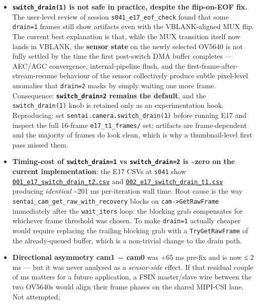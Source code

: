 \begin{itemize}
\tightlist
\item
  \textbf{\texttt{switch\_drain(1)} is not safe in practice, despite the
  flip-on-EOF fix.} The user-level review of session
  \texttt{s041\_e17\_eof\_check} found that some \texttt{drain=1} frames
  still show artifacts even with the VBLANK-aligned MUX flip. The
  current best explanation is that, while the MUX transition itself now
  lands in VBLANK, the \textbf{sensor state} on the newly selected
  OV5640 is not fully settled by the time the first post-switch DMA
  buffer completes --- AEC/AGC convergence, internal-pipeline flush, and
  the first-frame-after-stream-resume behaviour of the sensor
  collectively produce subtle pixel-level anomalies that
  \texttt{drain=2} masks by simply waiting one more frame. Consequence:
  \textbf{\texttt{switch\_drain=2} remains the default}, and the
  \texttt{switch\_drain(1)} knob is retained only as an experimentation
  hook. Reproducing: set \texttt{sentai.camera.switch\_drain(1)} before
  running E17 and inspect the full 16-frame \texttt{e17\_t1\_frames/}
  set; artifacts are frame-dependent and the majority of frames do look
  clean, which is why a thumbnail-level first pass missed them.
\item
  \textbf{Timing-cost of \texttt{switch\_drain=1} vs
  \texttt{switch\_drain=2} is \textasciitilde zero on the current
  implementation}: the E17 CSVs at \texttt{s041} show
  \href{../experiments/s041_e17_eof_check/001_e17_switch_drain_t2.csv}{\texttt{001\_e17\_switch\_drain\_t2.csv}}
  and
  \href{../experiments/s041_e17_eof_check/002_e17_switch_drain_t1.csv}{\texttt{002\_e17\_switch\_drain\_t1.csv}}
  producing \emph{identical} \textasciitilde201 ms per-iteration wall
  time. Root cause is the way
  \texttt{sentai\_cam\_get\_raw\_with\_recovery} blocks on
  \texttt{cam-\textgreater{}GetRawFrame} immediately after the
  \texttt{wait\_iters} loop: the blocking grab compensates for whichever
  frame threshold was chosen. To make \texttt{drain=1} actually cheaper
  would require replacing the trailing blocking grab with a
  \texttt{TryGetRawFrame} of the already-queued buffer, which is a
  non-trivial change to the drain path.
\item
  \textbf{Directional asymmetry cam1 − cam0} was +65 ms pre-fix and is
  now ≤ 2 ms --- but it was never analysed as a \emph{sensor-side}
  effect. If that residual couple of ms matters for a future
  application, a FSIN master/slave wire between the two OV5640s would
  align their frame phases on the shared MIPI-CSI lane. Not attempted;

\end{itemize}
